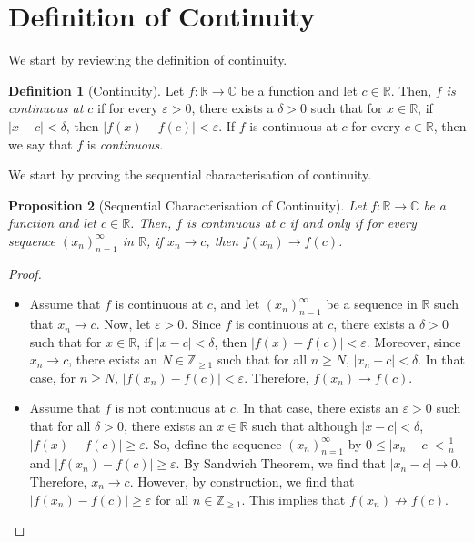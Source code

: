 \documentclass[a4paper, openany]{memoir}
\theoremstyle{definition}
\newtheorem{definition}{Definition}[section]
\theoremstyle{plain}
\newtheorem{proposition}[definition]{Proposition}
\begin{document}
\section{Definition of Continuity}
We start by reviewing the definition of continuity.
\begin{definition}[Continuity]
Let $f: \mathbb{R} \to \mathbb{C}$ be a function and let $c \in \mathbb{R}$. Then, \emph{$f$ is continuous at $c$} if for every $\varepsilon > 0$, there exists a $\delta > 0$ such that for $x \in \mathbb{R}$, if $|x - c| < \delta$, then $|f(x) - f(c)| < \varepsilon$. If $f$ is continuous at $c$ for every $c \in \mathbb{R}$, then we say that $f$ is \emph{continuous}.
\end{definition}
\noindent We start by proving the sequential characterisation of continuity.
\begin{proposition}[Sequential Characterisation of Continuity]
Let $f: \mathbb{R} \to \mathbb{C}$ be a function and let $c \in \mathbb{R}$. Then, $f$ is continuous at $c$ if and only if for every sequence $(x_n)_{n=1}^{\infty}$ in $\mathbb{R}$, if $x_n \to c$, then $f(x_n) \to f(c)$.
\end{proposition}
\begin{proof}
\hspace*{0pt}
\begin{itemize}
    \item Assume that $f$ is continuous at $c$, and let $(x_n)_{n=1}^{\infty}$ be a sequence in $\mathbb{R}$ such that $x_n \to c$. Now, let $\varepsilon > 0$. Since $f$ is continuous at $c$, there exists a $\delta > 0$ such that for $x \in \mathbb{R}$, if $|x - c| < \delta$, then $|f(x) - f(c)| < \varepsilon$. Moreover, since $x_n \to c$, there exists an $N \in \mathbb{Z}_{\geqslant 1}$ such that for all $n \geqslant N$, $|x_n - c| < \delta$. In that case, for $n \geqslant N$, $|f(x_n) - f(c)| < \varepsilon$. Therefore, $f(x_n) \to f(c)$.
    
    \item Assume that $f$ is not continuous at $c$. In that case, there exists an $\varepsilon > 0$ such that for all $\delta > 0$, there exists an $x \in \mathbb{R}$ such that although $|x - c| < \delta$, $|f(x) - f(c)| \geqslant \varepsilon$. So, define the sequence $(x_n)_{n=1}^{\infty}$ by $0 \leqslant |x_n - c| < \frac{1}{n}$ and $|f(x_n) - f(c)| \geqslant \varepsilon$. By Sandwich Theorem, we find that $|x_n - c| \to 0$. Therefore, $x_n \to c$. However, by construction, we find that $|f(x_n) - f(c)| \geqslant \varepsilon$ for all $n \in \mathbb{Z}_{\geqslant 1}$. This implies that $f(x_n) \not\to f(c)$.
\end{itemize}
\end{proof}
\end{document}
